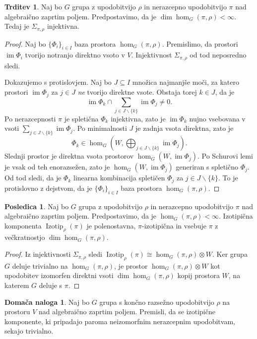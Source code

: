 \documentclass[11pt]{book}
\DeclareMathOperator\image{im}
\DeclareMathOperator\Izotip{Izotip}
\theoremstyle{definition}
\theoremstyle{zgled}
\theoremstyle{zgledbrezstevilke}
\theoremstyle{odprtproblem}
\theoremstyle{domacanaloga}
\newtheorem{domacanaloga}[theorem]{Domača naloga}
\newenvironment{dokaz}
    {\color{siva}\begin{proof}}
    {\end{proof}}
\theoremstyle{izrek}
\newtheorem{trditev}[theorem]{Trditev}
\newtheorem{posledica}[theorem]{Posledica}
\begin{document}
\begin{trditev}
Naj bo $G$ grupa z upodobitvijo $\rho$ in nerazcepno upodobitvijo $\pi$ nad algebraično zaprtim poljem. Predpostavimo, da je $\dim \hom_G(\pi, \rho) < \infty$. Tedaj je $\Sigma_{\pi, \rho}$ injektivna. 
\end{trditev}
\begin{dokaz}
Naj bo $\{ \Phi_i \}_{i \in I}$ baza prostora $\hom_G(\pi, \rho)$. Premislimo, da prostori $\image \Phi_i$ tvorijo notranjo direktno vsoto v $V$. Injektivnost $\Sigma_{\pi, \rho}$ od tod neposredno sledi.

Dokazujemo s protislovjem. Naj bo $J \subseteq I$ množica najmanjše moči, za katero prostori $\image \Phi_j$ za $j \in J$ \emph{ne} tvorijo direktne vsote. Obstaja torej $k \in J$, da je
\[
    \image \Phi_k \cap \sum_{j \in J \backslash \{ k \}} \image \Phi_j \neq 0.
\]
Po nerazcepnosti $\pi$ je spletična $\Phi_k$ injektivna, zato je $\image \Phi_k$ nujno vsebovana v vsoti $\sum_{j \in J \backslash \{ k \}} \image \Phi_j$. Po minimalnosti $J$ je zadnja vsota direktna, zato je 
\[
    \Phi_k \in \hom_G(W, \bigoplus_{j \in J \backslash \{ k \}} \image \Phi_j).
\]
Slednji prostor je direktna vsota prostorov $\hom_G(W, \image \Phi_j)$. Po Schurovi lemi je vsak od teh enorazsežen, zato je $\hom_G(W, \image \Phi_j)$ generiran s spletično $\Phi_j$. Od tod sledi, da je $\Phi_k$ linearna kombinacija spletičen $\Phi_j$ za $j \in J \backslash \{ k \}$. To je protislovno z dejstvom, da je $\{ \Phi_i \}_{i \in I}$ baza prostora $\hom_G(\pi, \rho)$.
\end{dokaz}

\begin{posledica}
Naj bo $G$ grupa z upodobitvijo $\rho$ in nerazcepno upodobitvijo $\pi$ nad algebraično zaprtim poljem. Predpostavimo, da je $\hom_G(\pi, \rho) < \infty$. Izotipična komponenta $\Izotip_{\rho}(\pi)$ je polenostavna, $\pi$-izotipična in vsebuje $\pi$ z večkratnostjo $\dim \hom_G(\pi, \rho)$.
\end{posledica}
\begin{dokaz}
Iz injektivnosti $\Sigma_{\pi, \rho}$ sledi $\Izotip_{\rho}(\pi) \cong \hom_G(\pi, \rho) \otimes W$. Ker grupa $G$ deluje trivialno na $\hom_G(\pi, \rho)$, je prostor $\hom_G(\pi, \rho) \otimes W$ kot upodobitev izomorfen direktni vsoti $\dim \hom_G(\pi, \rho)$ kopij prostora $W$, na katerem $G$ deluje s $\pi$.
\end{dokaz}

\begin{domacanaloga}
Naj bo $G$ grupa s končno razsežno upodobitvijo $\rho$ na prostoru $V$ nad algebraično zaprtim poljem. Premisli, da se izotipične komponente, ki pripadajo paroma neizomorfnim nerazcepnim upodobitvam, sekajo trivialno.
\end{domacanaloga}
\end{document}
